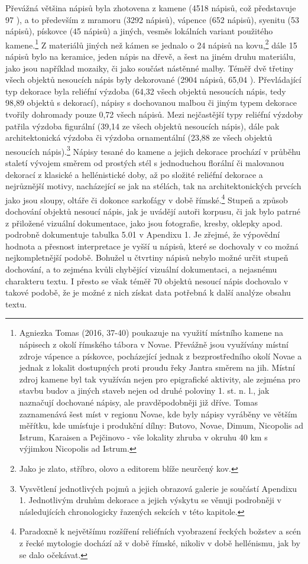 Převážná většina nápisů byla zhotovena z kamene (4518 nápisů, což představuje 97 ), a to především z mramoru (3292 nápisů), vápence (652 nápisů), syenitu (53 nápisů), pískovce (45 nápisů) a jiných, vesměs lokálních variant použitého kamene.\footnote{Agniezka Tomas (2016, 37-40) poukazuje na využití místního kamene na nápisech z okolí římského tábora v Novae. Převážně jsou využívány místní zdroje vápence a pískovce, pocházející jednak z bezprostředního okolí Novae a jednak z lokalit dostupných proti proudu řeky Jantra směrem na jih. Místní zdroj kamene byl tak využíván nejen pro epigrafické aktivity, ale zejména pro stavbu budov a jiných staveb nejen od druhé poloviny 1. st. n. l., jak naznačují dochované nápisy, ale pravděpodobněji již dříve. Tomas zaznamenává šest míst v regionu Novae, kde byly nápisy vyráběny ve větším měřítku, kde umísťuje i produkční dílny: Butovo, Novae, Dimum, Nicopolis ad Istrum, Karaisen a Pejčinovo - vše lokality zhruba v okruhu 40 km s výjimkou Nicopolis ad Istrum.} Z materiálů jiných než kámen se jednalo o 24 nápisů na kovu,\footnote{Jako je zlato, stříbro, olovo a editorem blíže neurčený kov.} dále 15 nápisů bylo na keramice, jeden nápis na dřevě, a šest na jiném druhu materiálu, jako jsou například mozaiky, či jako součást nástěnné malby. Téměř dvě třetiny všech objektů nesoucích nápis byly dekorované (2904 nápisů, 65,04 ). Převládající typ dekorace byla reliéfní výzdoba (64,32  všech objektů nesoucích nápis, tedy 98,89  objektů s dekorací), nápisy s dochovanou malbou či jiným typem dekorace tvořily dohromady pouze 0,72  všech nápisů. Mezi nejčastější typy reliéfní výzdoby patřila výzdoba figurální (39,14  ze všech objektů nesoucích nápis), dále pak architektonická výzdoba či výzdoba ornamentální (23,88  ze všech objektů nesoucích nápis).\footnote{Vysvětlení jednotlivých pojmů a jejich obrazová galerie je součástí Apendixu 1. Jednotlivým druhům dekorace a jejich výskytu se věnuji podrobněji v následujících chronologicky řazených sekcích v této kapitole.} Nápisy tesané do kamene a jejich dekorace prochází v průběhu staletí vývojem směrem od prostých stél s jednoduchou florální či malovanou dekorací z klasické a hellénistické doby, až po složité reliéfní dekorace a nejrůznější motivy, nacházející se jak na stélách, tak na architektonických prvcích jako jsou sloupy, oltáře či dokonce sarkofágy v době římské.\footnote{Paradoxně k největšímu rozšíření reliéfních vyobrazení řeckých božstev a scén z řecké mytologie dochází až v době římské, nikoliv v době hellénismu, jak by se dalo očekávat.} Stupeň a způsob dochování objektů nesoucí nápis, jak je uvádějí autoři korpusu, či jak bylo patrné z přiložené vizuální dokumentace, jako jsou fotografie, kresby, oklepky apod. podrobně dokumentuje tabulka 5.01 v Apendixu 1. Je zřejmé, že výpovědní hodnota a přesnost interpretace je vyšší u nápisů, které se dochovaly v co možná nejkompletnější podobě. Bohužel u čtvrtiny nápisů nebylo možné určit stupeň dochování, a to zejména kvůli chybějící vizuální dokumentaci, a nejasnému charakteru textu. I přesto se však téměř 70  objektů nesoucí nápis dochovalo v takové podobě, že je možné z nich získat data potřebná k další analýze obsahu textu.

